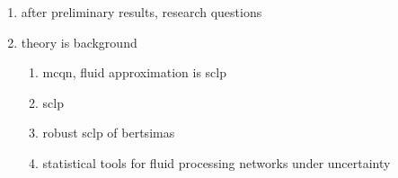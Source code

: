 \documentclass[11pt,a4paper,titlepage]{article}
\theoremstyle{definition}
\theoremstyle{plain}
\begin{document}
\begin{enumerate}
    \item after preliminary results, research questions
    \item theory is background
    \begin{enumerate}
        \item mcqn, fluid approximation is sclp
        \item sclp
        \item robust sclp of bertsimas
        \item statistical tools for fluid processing networks under uncertainty
    \end{enumerate}
\end{enumerate}

\clearpage
\printbibliography
\label{sec:bibliography}
\end{document}
